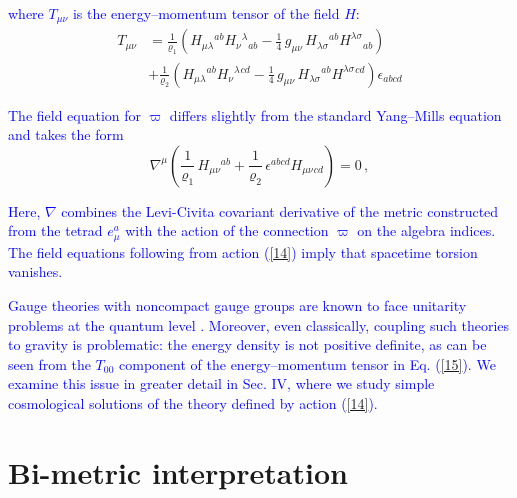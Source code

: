 \documentclass [prd,reprint,eqsecnum,nofootinbib]  {revtex4-1}
\newcommand{\corr}[1]{\textcolor{blue}{#1}}
\begin{document}
\corr{where $T_{\mu\nu}$ is the energy--momentum tensor of the field
$H$:}
\begin{align}

    T_{\mu\nu} &= \frac{1}{\varrho_1}\left(H_{\mu\lambda}{}^{ab} H_\nu{}^\lambda{}_{ab} -

    \frac14\, g_{\mu\nu}\,H_{\lambda\sigma}{}^{ab}

    H^{\lambda\sigma}{}_{ab}\right) \nonumber\\

    &+\frac{1}{\varrho_2}\left(H_{\mu\lambda}{}^{ab} H_\nu{}^\lambda{}^{cd} -

    \frac14\, g_{\mu\nu}\,H_{\lambda\sigma}{}^{ab}

    H^{\lambda\sigma}{}^{cd}\right)\epsilon_{abcd}\label{15}

\end{align}





\corr{The field equation for $\varpi$ differs slightly from the
standard Yang--Mills equation and takes the form}
\begin{equation}\label{16}

    \nabla^\mu \left(\frac1{\varrho_1}\, H_{\mu\nu}{}^{ab} +\frac1{\varrho_2}\,\epsilon^{abcd}

    H_{\mu\nu}{}_{cd}\right)=0\,,

\end{equation}

\corr{Here, $\nabla$ combines the Levi-Civita covariant derivative of
the metric constructed from the tetrad $e^a_\mu$ with the action of
the connection $\varpi$ on the algebra indices. The field equations
following from action (\ref{14}) imply that spacetime torsion
vanishes.}

\corr{Gauge theories with noncompact gauge groups are known to face
unitarity problems at the quantum level \cite{Hsu:1980zt}. Moreover,
even classically, coupling such theories to gravity is problematic:
the energy density is not positive definite, as can be seen from the
$T_{00}$ component of the energy--momentum tensor in Eq. (\ref{15}).
We examine this issue in greater detail in Sec. IV, where we study
simple cosmological solutions of the theory defined by action
(\ref{14}).}

\section{Bi-metric interpretation}
\end{document}
